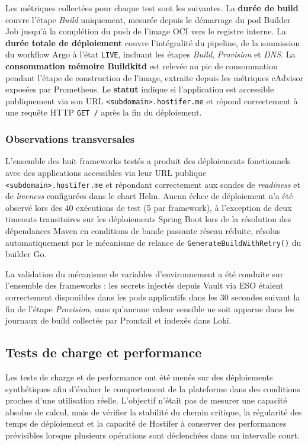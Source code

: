 Les métriques collectées pour chaque test sont les suivantes. La \textbf{durée de build} couvre l'étape \textit{Build} uniquement, mesurée depuis le démarrage du pod Builder Job jusqu'à la complétion du push de l'image OCI vers le registre interne. La \textbf{durée totale de déploiement} couvre l'intégralité du pipeline, de la soumission du workflow Argo à l'état \texttt{LIVE}, incluant les étapes \textit{Build}, \textit{Provision} et \textit{DNS}. La \textbf{consommation mémoire Buildkitd} est relevée au pic de consommation pendant l'étape de construction de l'image, extraite depuis les métriques cAdvisor exposées par Prometheus. Le \textbf{statut} indique si l'application est accessible publiquement via son URL \texttt{<subdomain>.hostifer.me} et répond correctement à une requête HTTP \texttt{GET /} après la fin du déploiement.

\subsubsection*{Observations transversales}

L'ensemble des huit frameworks testés a produit des déploiements fonctionnels avec des applications accessibles via leur URL publique \texttt{<subdomain>.hostifer.me} et répondant correctement aux sondes de \textit{readiness} et de \textit{liveness} configurées dans le chart Helm. Aucun échec de déploiement n'a été observé lors des 40 exécutions de test (5 par framework), à l'exception de deux timeouts transitoires sur les déploiements Spring Boot lors de la résolution des dépendances Maven en conditions de bande passante réseau réduite, résolus automatiquement par le mécanisme de relance de \texttt{GenerateBuildWithRetry()} du builder Go.

La validation du mécanisme de variables d'environnement a été conduite sur l'ensemble des frameworks : les secrets injectés depuis Vault via ESO étaient correctement disponibles dans les pods applicatifs dans les 30 secondes suivant la fin de l'étape \textit{Provision}, sans qu'aucune valeur sensible ne soit apparue dans les journaux de build collectés par Promtail et indexés dans Loki.

\subsection{Tests de charge et performance}

Les tests de charge et de performance ont été menés sur des déploiements synthétiques afin d'évaluer le comportement de la plateforme dans des conditions proches d'une utilisation réelle. L'objectif n'était pas de mesurer une capacité absolue de calcul, mais de vérifier la stabilité du chemin critique, la régularité des temps de déploiement et la capacité de Hostifer à conserver des performances prévisibles lorsque plusieurs opérations sont déclenchées dans un intervalle court.

